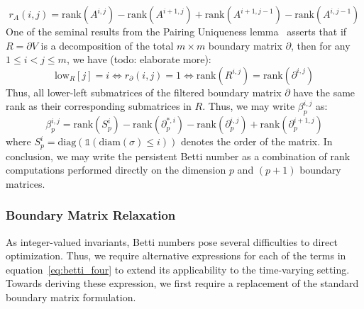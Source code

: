 \documentclass[10pt]{article}
\begin{document}
\begin{equation}
	r_A(i,j) = \mathrm{rank}(A^{i, j}) - \mathrm{rank}(A^{i+1, j}) + \mathrm{rank}(A^{i+1, j-1}) - \mathrm{rank}(A^{i, j-1})
\end{equation}
One of the seminal results from the Pairing Uniqueness lemma~\cite{} asserts that if $R = \partial V$ is a decomposition of the total $m \times m$ boundary matrix $\partial$, then for any $1 \leq i < j \leq m$, we have (todo: elaborate more): 
$$ \mathrm{low}_R[j] = i \iff r_\partial(i,j) = 1 \iff \mathrm{rank}(R^{i,j}) = \mathrm{rank}(\partial^{i, j})$$
Thus, all lower-left submatrices of the filtered boundary matrix $\partial$ have the same rank as their corresponding submatrices in $R$. Thus, we may write $\beta_p^{i,j}$ as: 
\begin{equation}\label{eq:betti_four}
	\beta_p^{i,j} = \mathrm{rank}(S_p^i) - \mathrm{rank}(\partial_p^{\ast,i}) - \mathrm{rank}(\partial_p^{i,j}) + \mathrm{rank}(\partial_p^{i+1,j})
\end{equation}
where $S_p^i = \mathrm{diag}(\mathds{1}(\mathrm{diam}(\sigma) \leq i))$ denotes the order of the matrix. In conclusion, we may write the persistent Betti number as a combination of rank computations performed directly on the dimension $p$ and $(p+1)$ boundary matrices. 


\subsubsection*{Boundary Matrix Relaxation}
As integer-valued invariants, Betti numbers pose several difficulties to direct optimization. Thus, we require alternative expressions for each of the terms in equation~\eqref{eq:betti_four} to extend its applicability to the time-varying setting. Towards deriving these expression, we first require a replacement of the standard boundary matrix formulation. 
\end{document}
